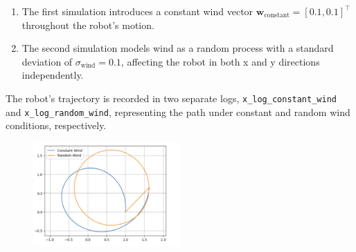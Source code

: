 \documentclass[letterpaper, 10 pt, conference]{ieeeconf}  %
\begin{document}
\begin{enumerate}
    \item The first simulation introduces a constant wind vector \( \mathbf{w}_{\text{constant}} = [0.1, 0.1]^\top \) throughout the robot's motion.
    \item The second simulation models wind as a random process with a standard deviation of \( \sigma_{\text{wind}} = 0.1 \), affecting the robot in both x and y directions independently.
\end{enumerate}

The robot's trajectory is recorded in two separate logs, \texttt{x\_log\_constant\_wind} and \texttt{x\_log\_random\_wind}, representing the path under constant and random wind conditions, respectively.

\begin{figure}[htbp]
    \centering
    \includegraphics[width=0.5\textwidth]{image4.png}
\end{figure}
\end{document}
